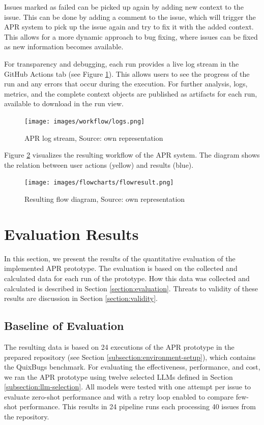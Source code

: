 Issues marked as failed can be picked up again by adding new context to the issue. This can be done by adding a comment to the issue, which will trigger the APR system to pick up the issue again and try to fix it with the added context. This allows for a more dynamic approach to bug fixing, where issues can be fixed as new information becomes available.


For transparency and debugging, each run provides a live log stream in the GitHub Actions tab (see Figure \ref{fig:log-stream}). This allows users to see the progress of the run and any errors that occur during the execution. For further analysis, logs, metrics, and the complete context objects are published as artifacts for each run, available to download in the run view.
\begin{figure}[H]
    \centering
    \texttt{[image: images/workflow/logs.png]}
    \caption{APR log stream, Source: own representation}
    \label{fig:log-stream}
\end{figure}

Figure \ref{fig:flow} visualizes the resulting workflow of the APR system. The diagram shows the relation between user actions (yellow) and results (blue).

\begin{figure}[H]
    \centering
    \texttt{[image: images/flowcharts/flowresult.png]}
    \caption{Resulting flow diagram, Source: own representation}
    \label{fig:flow}
\end{figure}

\section{Evaluation Results} \label{section:evaluation-results}

In this section, we present the results of the quantitative evaluation of the implemented APR prototype. The evaluation is based on the collected and calculated data for each run of the prototype. How this data was collected and calculated is described in Section \ref{section:evaluation}. Threats to validity of these results are discussion in Section \ref{section:validity}.

\subsection{Baseline of Evaluation}

The resulting data is based on 24 executions of the APR prototype in the prepared repository (see Section \ref{subsection:environment-setup}), which contains the QuixBugs benchmark. For evaluating the effectiveness, performance, and cost, we ran the APR prototype using twelve selected \acp{LLM} defined in Section \ref{subsection:llm-selection}. All models were tested with one attempt per issue to evaluate zero-shot performance and with a retry loop enabled to compare few-shot performance. This results in 24 pipeline runs each processing 40 issues from the repository.

